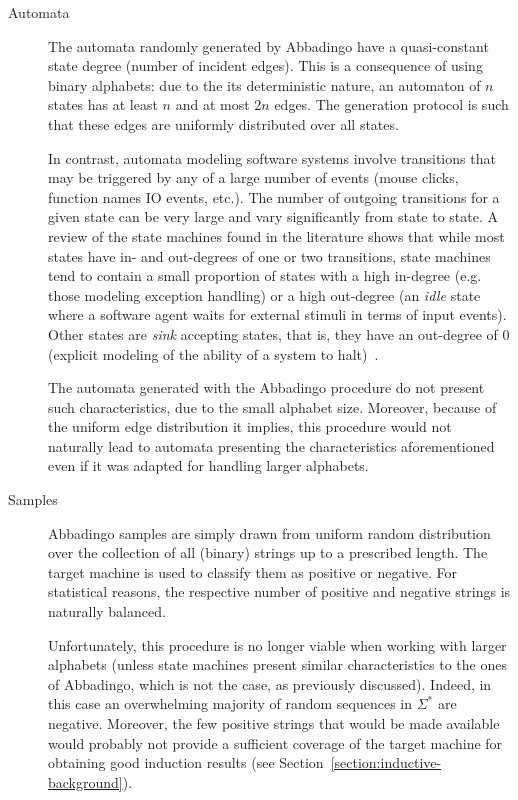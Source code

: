 \begin{description}
\item[Automata] The automata randomly generated by Abbadingo have a quasi-constant state degree (number of incident edges). This is a consequence of using binary alphabets: due to the its deterministic nature, an automaton of $n$ states has at least $n$ and at most $2n$ edges. The generation protocol is such that these edges are uniformly distributed over all states. 

In contrast, automata modeling software systems involve transitions that may be triggered by any of a large number of events (mouse clicks, function names IO events, etc.). The number of outgoing transitions for a given state can be very large and vary significantly from state to state. A review of the state machines found in the literature shows that while most states have in- and out-degrees of one or two transitions, state machines tend to contain a small proportion of states with a high in-degree (e.g. those modeling exception handling) or a high out-degree (an \emph{idle} state where a software agent waits for external stimuli in terms of input events). Other states are \emph{sink} accepting states, that is, they have an out-degree of 0 (explicit modeling of the ability of a system to halt)~\cite{Walkinshaw:2008}.

The automata generated with the Abbadingo procedure do not present such characteristics, due to the small alphabet size. Moreover, because of the uniform edge distribution it implies, this procedure would not naturally lead to automata presenting the characteristics aforementioned even if it was adapted for handling larger alphabets.

\item[Samples] Abbadingo samples are simply drawn from uniform random distribution over the collection of all (binary) strings up to a prescribed length. The target machine is used to classify them as positive or negative. For statistical reasons, the respective number of positive and negative strings is naturally balanced.

Unfortunately, this procedure is no longer viable when working with larger alphabets (unless state machines present similar characteristics to the ones of Abbadingo, which is not the case, as previously discussed). Indeed, in this case an overwhelming majority of random sequences in $\Sigma^*$ are negative. Moreover, the few positive strings that would be made available would probably not provide a sufficient coverage of the target machine for obtaining good induction results (see Section~\ref{section:inductive-background}).


\end{description}

